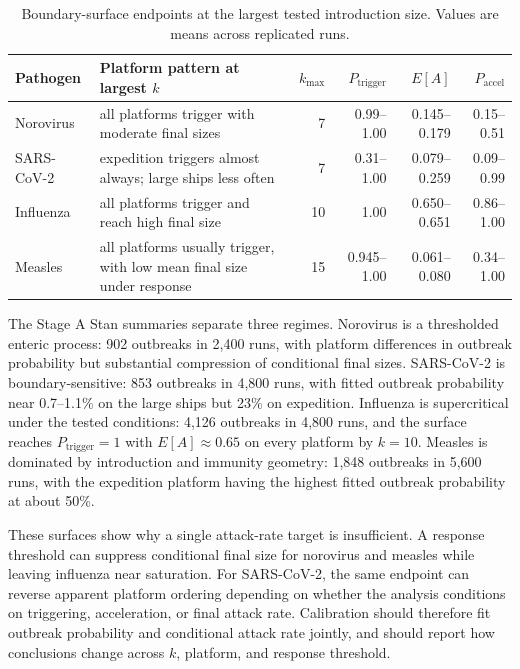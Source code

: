 \begin{table}[htbp]
\centering
\caption{Boundary-surface endpoints at the largest tested introduction size. Values are means across replicated runs.}
\label{tab:boundary-surface-endpoints}
\begin{tabularx}{\textwidth}{lXrrrr}
\toprule
Pathogen & Platform pattern at largest \(k\) & \(k_{\max}\) & \(P_{\mathrm{trigger}}\) & \(E[A]\) & \(P_{\mathrm{accel}}\) \\
\midrule
Norovirus & all platforms trigger with moderate final sizes & 7 & 0.99--1.00 & 0.145--0.179 & 0.15--0.51 \\
SARS-CoV-2 & expedition triggers almost always; large ships less often & 7 & 0.31--1.00 & 0.079--0.259 & 0.09--0.99 \\
Influenza & all platforms trigger and reach high final size & 10 & 1.00 & 0.650--0.651 & 0.86--1.00 \\
Measles & all platforms usually trigger, with low mean final size under response & 15 & 0.945--1.00 & 0.061--0.080 & 0.34--1.00 \\
\bottomrule
\end{tabularx}
\end{table}

The Stage A Stan summaries separate three regimes. Norovirus is a thresholded enteric process: 902 outbreaks in
2,400 runs, with platform differences in outbreak probability but substantial compression of conditional final
sizes. SARS-CoV-2 is boundary-sensitive: 853 outbreaks in 4,800 runs, with fitted outbreak probability near
0.7--1.1\% on the large ships but 23\% on expedition. Influenza is supercritical under the tested conditions: 4,126
outbreaks in 4,800 runs, and the surface reaches \(P_{\mathrm{trigger}}=1\) with \(E[A]\approx0.65\) on every
platform by \(k=10\). Measles is dominated by introduction and immunity geometry: 1,848 outbreaks in 5,600 runs,
with the expedition platform having the highest fitted outbreak probability at about 50\%.

These surfaces show why a single attack-rate target is insufficient. A response threshold can suppress conditional
final size for norovirus and measles while leaving influenza near saturation. For SARS-CoV-2, the same endpoint can
reverse apparent platform ordering depending on whether the analysis conditions on triggering, acceleration, or
final attack rate. Calibration should therefore fit outbreak probability and conditional attack rate jointly, and
should report how conclusions change across \(k\), platform, and response threshold.

